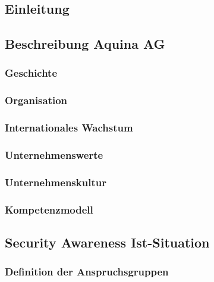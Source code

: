 \documentclass[../../main.tex]{subfiles}
\begin{document}
\subsection{Einleitung}


\subsection{Beschreibung Aquina AG}


\subsubsection{Geschichte}


\subsubsection{Organisation}


\subsubsection{Internationales Wachstum}


\subsubsection{Unternehmenswerte}


\subsubsection{Unternehmenskultur}

    
\subsubsection{Kompetenzmodell}





\subsection{Security Awareness Ist-Situation}

\subsubsection{Definition der Anspruchsgruppen}

\end{document}
